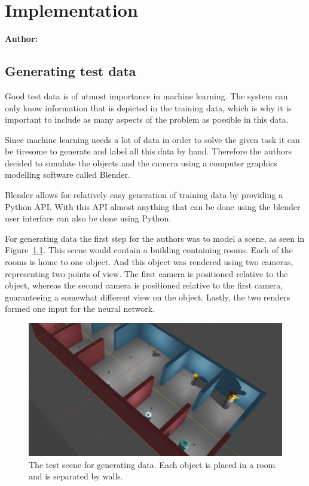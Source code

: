 \chapter{Implementation}

\textbf{Author: } 

\section{Generating test data}
Good test data is of utmost importance in machine learning. The system can only know information that is depicted in the training data, which is why it is important to include as many aspects of the problem as possible in this data.

Since machine learning needs a lot of data in order to solve the given task it can be tiresome to generate and label all this data by hand. Therefore the authors decided to simulate the objects and the camera using a computer graphics modelling software called Blender.

Blender allows for relatively easy generation of training data by providing a Python API. With this API almost anything that can be done using the blender user interface can also be done using Python.

For generating data the first step for the authors was to model a scene, as seen in Figure~\ref{pic:implementation_generatingData_blenderSetup}. This scene would contain a building containing rooms. Each of the rooms is home to one object. And this object was rendered using two cameras, representing two points of view. The first camera is positioned relative to the object, whereas the second camera is positioned relative to the first camera, guaranteeing a somewhat different view on the object. Lastly, the two renders formed one input for the neural network.

\begin{figure}[h!]
	\centering
	\includegraphics[width=5in]{img/implementation_generatingData_blenderSetup.png}
	\caption{The test scene for generating data. Each object is placed in a room and is separated by walls.}
	\label{pic:implementation_generatingData_blenderSetup}
\end{figure}

